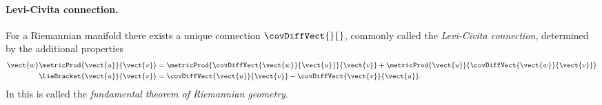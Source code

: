 \paragraph{Levi-Civita connection.}
For a Riemannian manifold there exists a unique connection $\covDiffVect{}{}$, commonly called the \textit{Levi-Civita connection}, determined by the additional properties
\begin{subequations}\label{eq:LeviCivitaProp}
\begin{align}
 \label{eq:LeviCivitaMetric}
 \vect{w} \metricProd{\vect{u}}{\vect{v}} &= \metricProd{\covDiffVect{\vect{w}}{\vect{u}}}{\vect{v}} + \metricProd{\vect{u}}{\covDiffVect{\vect{w}}{\vect{v}}}
\\
 \label{eq:LeviCivitaSymmetry}
 \LieBracket{\vect{u}}{\vect{v}} &= \covDiffVect{\vect{u}}{\vect{v}} - \covDiffVect{\vect{v}}{\vect{u}}.
\end{align}
\end{subequations}
In \cite[Theo.\,VII.3.3]{Boothby:DiffGeo} this is called the \textit{fundamental theorem of Riemannian geometry}.

